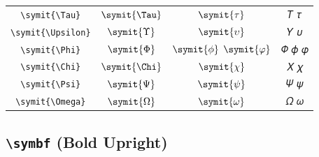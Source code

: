 \documentclass[12pt,a4paper]{article}
\begin{document}
\begin{longtable}{|c|c|c|c|}
\verb|\symit{\Tau}| & $\symit{\Tau}$ & $\symit{\tau}$ & 𝛵 𝜏 \\
\verb|\symit{\Upsilon}| & $\symit{\Upsilon}$ & $\symit{\upsilon}$ & 𝛶 𝜐 \\
\verb|\symit{\Phi}| & $\symit{\Phi}$ & $\symit{\phi}$ $\symit{\varphi}$ & 𝛷 𝜙 𝜑 \\
\verb|\symit{\Chi}| & $\symit{\Chi}$ & $\symit{\chi}$ & 𝛸 𝜒 \\
\verb|\symit{\Psi}| & $\symit{\Psi}$ & $\symit{\psi}$ & 𝛹 𝜓 \\
\verb|\symit{\Omega}| & $\symit{\Omega}$ & $\symit{\omega}$ & 𝛺 𝜔 \\
\hline
\end{longtable}

\newpage

\subsection*{\texttt{\textbackslash{}symbf} (Bold Upright)}
\end{document}
